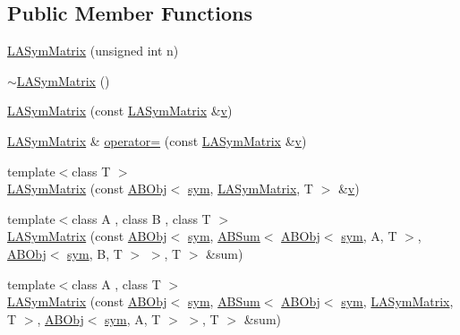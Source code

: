 \subsection*{Public Member Functions}
\begin{DoxyCompactItemize}
\item 
\mbox{\hyperlink{classROOT_1_1Minuit2_1_1LASymMatrix_a9fe58788095d0860bb44bde53457782c}{L\+A\+Sym\+Matrix}} (unsigned int n)
\item 
\mbox{\hyperlink{classROOT_1_1Minuit2_1_1LASymMatrix_a6de4c2f5940002a13411348985d1b784}{$\sim$\+L\+A\+Sym\+Matrix}} ()
\item 
\mbox{\hyperlink{classROOT_1_1Minuit2_1_1LASymMatrix_ac74006982da0bcda789c1237e0022033}{L\+A\+Sym\+Matrix}} (const \mbox{\hyperlink{classROOT_1_1Minuit2_1_1LASymMatrix}{L\+A\+Sym\+Matrix}} \&\mbox{\hyperlink{hadron__timeslice_8cc_a716fc87f5e814be3ceee2405ed6ff22a}{v}})
\item 
\mbox{\hyperlink{classROOT_1_1Minuit2_1_1LASymMatrix}{L\+A\+Sym\+Matrix}} \& \mbox{\hyperlink{classROOT_1_1Minuit2_1_1LASymMatrix_a31521afba8179a28e7744af51850922e}{operator=}} (const \mbox{\hyperlink{classROOT_1_1Minuit2_1_1LASymMatrix}{L\+A\+Sym\+Matrix}} \&\mbox{\hyperlink{hadron__timeslice_8cc_a716fc87f5e814be3ceee2405ed6ff22a}{v}})
\item 
{\footnotesize template$<$class T $>$ }\\\mbox{\hyperlink{classROOT_1_1Minuit2_1_1LASymMatrix_ab44b18a4c1b65cb054c884661843a4a0}{L\+A\+Sym\+Matrix}} (const \mbox{\hyperlink{classROOT_1_1Minuit2_1_1ABObj}{A\+B\+Obj}}$<$ \mbox{\hyperlink{classROOT_1_1Minuit2_1_1sym}{sym}}, \mbox{\hyperlink{classROOT_1_1Minuit2_1_1LASymMatrix}{L\+A\+Sym\+Matrix}}, T $>$ \&\mbox{\hyperlink{hadron__timeslice_8cc_a716fc87f5e814be3ceee2405ed6ff22a}{v}})
\item 
{\footnotesize template$<$class A , class B , class T $>$ }\\\mbox{\hyperlink{classROOT_1_1Minuit2_1_1LASymMatrix_a50f5a1e686ba0b5ac1d296432bdea484}{L\+A\+Sym\+Matrix}} (const \mbox{\hyperlink{classROOT_1_1Minuit2_1_1ABObj}{A\+B\+Obj}}$<$ \mbox{\hyperlink{classROOT_1_1Minuit2_1_1sym}{sym}}, \mbox{\hyperlink{classROOT_1_1Minuit2_1_1ABSum}{A\+B\+Sum}}$<$ \mbox{\hyperlink{classROOT_1_1Minuit2_1_1ABObj}{A\+B\+Obj}}$<$ \mbox{\hyperlink{classROOT_1_1Minuit2_1_1sym}{sym}}, A, T $>$, \mbox{\hyperlink{classROOT_1_1Minuit2_1_1ABObj}{A\+B\+Obj}}$<$ \mbox{\hyperlink{classROOT_1_1Minuit2_1_1sym}{sym}}, B, T $>$ $>$, T $>$ \&sum)
\item 
{\footnotesize template$<$class A , class T $>$ }\\\mbox{\hyperlink{classROOT_1_1Minuit2_1_1LASymMatrix_a252615373ae5ffe035baa9e8221e67e3}{L\+A\+Sym\+Matrix}} (const \mbox{\hyperlink{classROOT_1_1Minuit2_1_1ABObj}{A\+B\+Obj}}$<$ \mbox{\hyperlink{classROOT_1_1Minuit2_1_1sym}{sym}}, \mbox{\hyperlink{classROOT_1_1Minuit2_1_1ABSum}{A\+B\+Sum}}$<$ \mbox{\hyperlink{classROOT_1_1Minuit2_1_1ABObj}{A\+B\+Obj}}$<$ \mbox{\hyperlink{classROOT_1_1Minuit2_1_1sym}{sym}}, \mbox{\hyperlink{classROOT_1_1Minuit2_1_1LASymMatrix}{L\+A\+Sym\+Matrix}}, T $>$, \mbox{\hyperlink{classROOT_1_1Minuit2_1_1ABObj}{A\+B\+Obj}}$<$ \mbox{\hyperlink{classROOT_1_1Minuit2_1_1sym}{sym}}, A, T $>$ $>$, T $>$ \&sum)

\end{DoxyCompactItemize}
